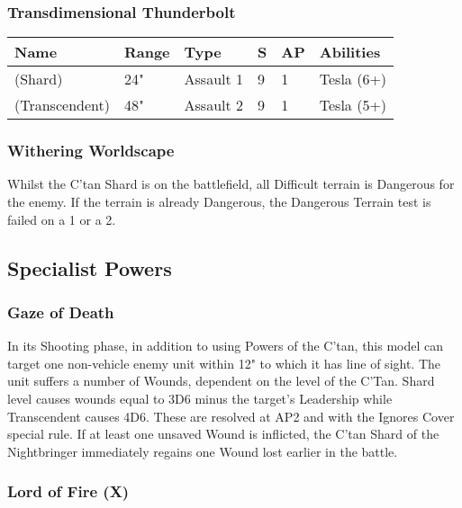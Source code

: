 \subsubsection{Transdimensional Thunderbolt} \label{Transdimensional Thunderbolt}

\noindent
\begin{tabular}{||m{160pt} m{31pt} m{55pt} m{12pt} m{12pt} m{200pt}||}
	\hline
	Name & Range & Type & S & AP & Abilities \\
	\hline
	\quickref{Transdimensional Thunderbolt} (Shard) & 24" & Assault 1 & 9 & 1 & Tesla (6+) \\
	\quickref{Transdimensional Thunderbolt} (Transcendent) & 48" & Assault 2 & 9 & 1 & Tesla (5+) \\
	\hline
\end{tabular}

\subsubsection{Withering Worldscape} \label{Withering Worldscape}

Whilst the C'tan Shard is on the battlefield, all Difficult terrain is Dangerous for the enemy. If the terrain is already Dangerous, the Dangerous Terrain test is failed on a 1 or a 2.

\subsection{Specialist Powers}

\subsubsection{Gaze of Death} \label{Gaze of Death}

In its Shooting phase, in addition to using Powers of the C’tan, this model can target one non-vehicle enemy unit within 12" to which it has line of sight. The unit suffers a number of Wounds, dependent on the level of the C'Tan. Shard level causes wounds equal to 3D6 minus the target's Leadership while Transcendent causes 4D6. These are resolved at AP2 and with the Ignores Cover special rule. If at least one unsaved Wound is inflicted, the C’tan Shard of the Nightbringer immediately regains one Wound lost earlier in the battle.

\subsubsection{Lord of Fire (X)} \label{Lord of Fire}

